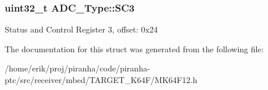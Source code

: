 \subsubsection[{\texorpdfstring{S\+C3}{SC3}}]{ uint32\+\_\+t A\+D\+C\+\_\+\+Type\+::\+S\+C3}\hypertarget{structADC__Type_af69704301d23c620abacbbdfa7caa05e}{}\label{structADC__Type_af69704301d23c620abacbbdfa7caa05e}
Status and Control Register 3, offset\+: 0x24 

The documentation for this struct was generated from the following file\+:\begin{DoxyCompactItemize}
\item 
/home/erik/proj/piranha/code/piranha-\/ptc/src/receiver/mbed/\+T\+A\+R\+G\+E\+T\+\_\+\+K64\+F/M\+K64\+F12.\+h\end{DoxyCompactItemize}
